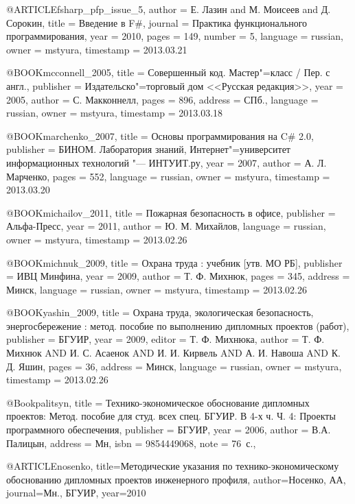 @ARTICLE{fsharp_pfp_issue_5,
  author = {Е. Лазин and М. Моисеев and Д. Сорокин},
  title = {Введение в F\#},
  journal = {Практика функционального программирования},
  year = {2010},
  pages = {149},
  number = {5},
  language = {russian},
  owner = {mstyura},
  timestamp = {2013.03.21}
}

@BOOK{mcconnell_2005,
  title = {Совершенный код. Мастер"=класс / Пер. с англ.},
  publisher = {Издательско"=торговый дом <<Русская редакция>>},
  year = {2005},
  author = {С. Макконнелл},
  pages = {896},
  address = {СПб.},
  language = {russian},
  owner = {mstyura},
  timestamp = {2013.03.18}
}

@BOOK{marchenko_2007,
  title = {Основы программирования на C\# 2.0},
  publisher = {БИНОМ. Лаборатория знаний, Интернет"=университет информационных технологий
	"--- ИНТУИТ.ру},
  year = {2007},
  author = {А. Л. Марченко},
  pages = {552},
  language = {russian},
  owner = {mstyura},
  timestamp = {2013.03.20}
}

@BOOK{michailov_2011,
  title = {Пожарная безопасность в офисе},
  publisher = {Альфа-Пресс},
  year = {2011},
  author = {Ю. М. Михайлов},
  language = {russian},
  owner = {mstyura},
  timestamp = {2013.02.26}
}

@BOOK{michnuk_2009,
  title = {Охрана труда : учебник [утв. МО РБ]},
  publisher = {ИВЦ Минфина},
  year = {2009},
  author = {Т. Ф. Михнюк},
  pages = {345},
  address = {Минск},
  language = {russian},
  owner = {mstyura},
  timestamp = {2013.02.26}
}

@BOOK{yashin_2009,
  title = {Охрана труда, экологическая безопасность, энергосбережение : метод.
	пособие по выполнению дипломных проектов (работ)},
  publisher = {БГУИР},
  year = {2009},
  editor = {Т. Ф. Михнюка},
  author = {Т. Ф. Михнюк AND И. С. Асаенок AND И. И. Кирвель AND А. И. Навоша
	AND К. Д. Яшин},
  pages = {36},
  address = {Минск},
  language = {russian},
  owner = {mstyura},
  timestamp = {2013.02.26}
}

@Book{palitsyn,
  title     = {Технико-экономическое обоснование дипломных проектов: Метод. пособие для студ. всех спец. БГУИР. В 4-х ч. Ч. 4: Проекты программного обеспечения},
  publisher = {БГУИР},
  year      = {2006},
  author    = {В.А. Палицын},
  address   = {Мн},
  isbn      = {9854449068},
  note      = {76~с.},
}

@ARTICLE{nosenko,
  title={Методические указания по технико-экономическому обоснованию дипломных проектов инженерного профиля},
  author={Носенко, АА},
  journal={Мн., БГУИР},
  year={2010}
}

